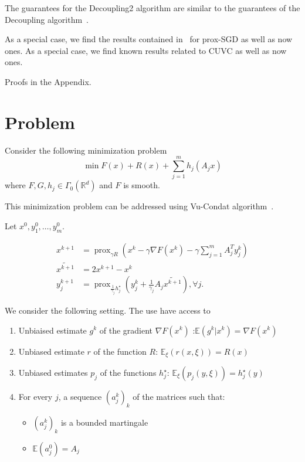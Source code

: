 \documentclass{article}
\DeclareMathOperator{\prox}{prox}
\newcommand{\bR}{{\mathbb R}}
\newcommand{\bE}{{\mathbb E}}
\theoremstyle{definition}
\begin{document}
The guarantees for the Decoupling2 algorithm are similar to the guarantees of the Decoupling algorithm~\cite{mishchenko2019stochastic}. 

As a special case, we find the results contained in~\cite{gorbunov2019unified} for prox-SGD as well as now ones. 
As a special case, we find known results related to CUVC as well as now ones.

Proofs in the Appendix.

\section{Problem}

Consider the following minimization problem
\begin{equation}
    \label{eq:pb-original}
    \min F(x) + R(x) + \sum_{j=1}^m h_j(A_j x)
\end{equation}
where $F,G,h_j \in \Gamma_0(\bR^d)$ and $F$ is smooth.

This minimization problem can be addressed using Vu-Condat algorithm~\cite{vu-condat}. 

Let $x^0,y_1^0,\ldots,y_m^0$.

\begin{align}
    \label{Vu-Condat}
    x^{k+1}   &= \prox_{\gamma R}(x^k - \gamma \nabla F(x^k) - \gamma \sum_{j=1}^m A_j^{T} y_j^k)\\
    \widetilde{x^{k+1}} &= 2x^{k+1} - x^k\\
    y_j^{k+1} &= \prox_{\frac{1}{\gamma_j} h_j^\star}(y_j^k + \frac{1}{\gamma_j}A_j\widetilde{x^{k+1}} ), \forall j.
\end{align}

We consider the following setting. The use have access to 

\begin{enumerate}
    \item Unbiaised estimate $g^{k}$ of the gradient $\nabla F(x^k)$ :$\bE(g^k|x^k) = \nabla F(x^k)$
    \item Unbiased estimate $r$ of the function $R$: $\bE_\xi(r(x,\xi)) = R(x)$ 
    \item Unbiased estimates $p_j$ of the functions $h_j^\star$: $\bE_\xi(p_j(y,\xi)) = h_j^\star(y)$
    \item For every $j$, a sequence $(a_j^k)_k$ of the matrices such that: \begin{itemize}
                                                                                        \item $(a_j^k)_k$ is a bounded martingale
                                                                                        \item $\bE(a_j^0) = A_j$
    \end{itemize}
\end{enumerate}  
\end{document}

